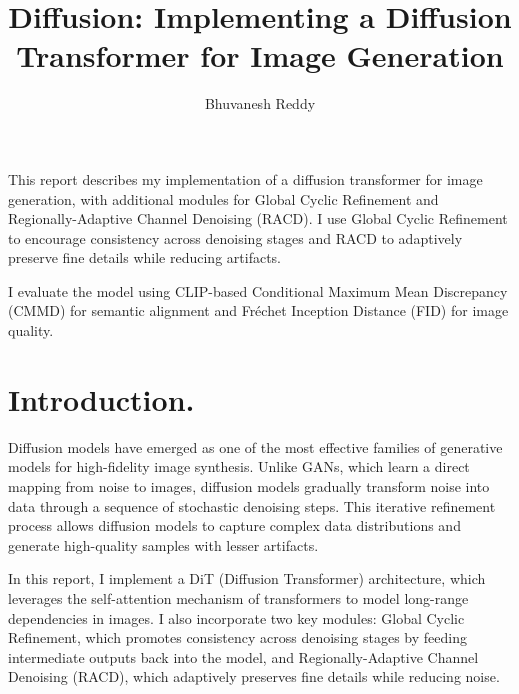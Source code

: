\documentclass[10pt]{article}
\title{%
    Diffusion: Implementing a Diffusion Transformer for Image Generation \\
}
\author{%
    Bhuvanesh Reddy
}
\date{\small\muted{\today}}
\theoremstyle{plain}
\begin{document}

\maketitle
\thispagestyle{empty}

\begin{tcolorbox}[
    enhanced,
    colback=altbgraised,
    colframe=altborder,
    coltext=alttext,
    arc=0pt, outer arc=0pt,
    boxrule=0.5pt,
    sharp corners,
    left=6pt, right=6pt, top=5pt, bottom=5pt,
    before upper={\textbf{\small Abstract.}\hspace{0.5em}}
]
\small
This report describes my implementation of a diffusion transformer for image generation, with additional modules for Global Cyclic Refinement and Regionally-Adaptive Channel Denoising (RACD). I use Global Cyclic Refinement to encourage consistency across denoising stages and RACD to adaptively preserve fine details while reducing artifacts.

I evaluate the model using CLIP-based Conditional Maximum Mean Discrepancy (CMMD) for semantic alignment and Fréchet Inception Distance (FID) for image quality. 
\end{tcolorbox}

\vspace{0.5em}


\section{Introduction.}

Diffusion models have emerged as one of the most effective families of generative models for high-fidelity image synthesis. Unlike GANs, which learn a direct mapping from noise to images, diffusion models gradually transform noise into data through a sequence of stochastic denoising steps. This iterative refinement process allows diffusion models to capture complex data distributions and generate high-quality samples with lesser artifacts. 

In this report, I implement a DiT (Diffusion Transformer) architecture, which leverages the self-attention mechanism of transformers to model long-range dependencies in images. I also incorporate two key modules: Global Cyclic Refinement, which promotes consistency across denoising stages by feeding intermediate outputs back into the model, and Regionally-Adaptive Channel Denoising (RACD), which adaptively preserves fine details while reducing noise.
\end{document}
